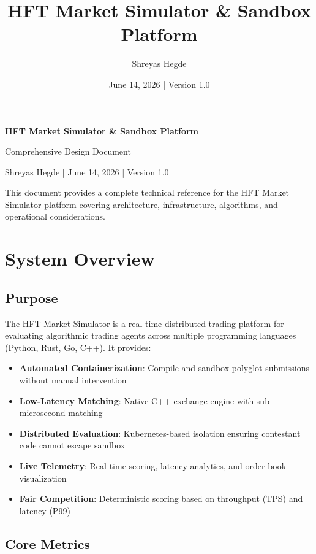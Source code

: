 \documentclass[10pt,a4paper,oneside]{report}
\title{\Large\bf HFT Market Simulator \& Sandbox Platform}
\author{\small Shreyas Hegde}
\date{\small June 14, 2026 | Version 1.0}
\begin{document}
{\centering\Large\bf HFT Market Simulator \& Sandbox Platform \par\medskip
\small Comprehensive Design Document \par\small Shreyas Hegde | June 14, 2026 | Version 1.0 \par}

\vspace{6pt}
\noindent
This document provides a complete technical reference for the HFT Market Simulator platform covering architecture, infrastructure, algorithms, and operational considerations.

\newpage
{\small\tableofcontents}
\newpage

\chapter{System Overview}

\section{Purpose}

The HFT Market Simulator is a real-time distributed trading platform for evaluating algorithmic trading agents across multiple programming languages (Python, Rust, Go, C++). It provides:

\begin{itemize}
    \item \textbf{Automated Containerization}: Compile and sandbox polyglot submissions without manual intervention
    \item \textbf{Low-Latency Matching}: Native C++ exchange engine with sub-microsecond matching
    \item \textbf{Distributed Evaluation}: Kubernetes-based isolation ensuring contestant code cannot escape sandbox
    \item \textbf{Live Telemetry}: Real-time scoring, latency analytics, and order book visualization
    \item \textbf{Fair Competition}: Deterministic scoring based on throughput (TPS) and latency (P99)
\end{itemize}

\section{Core Metrics}
\end{document}
